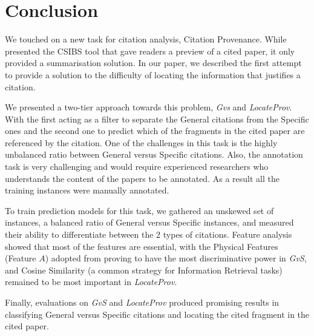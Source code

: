 \chapter{Conclusion}
\label{conclusion}
We touched on a new task for citation analysis, Citation Provenance. While  presented the CSIBS tool that gave readers a preview of a cited paper, it only provided a summarisation solution. In our paper, we described the first attempt to provide a solution to the difficulty of locating the information that justifies a citation.

We presented a two-tier approach towards this problem, {\it Gvs} and {\it LocateProv}. With the first acting as a filter to separate the General citations from the Specific ones and the second one to predict which of the fragments in the cited paper are referenced by the citation. One of the challenges in this task is the highly unbalanced ratio between General versus Specific citations. Also, the annotation task is very challenging and would require experienced researchers who understands the content of the papers to be annotated. As a result all the training instances were manually annotated.

To train prediction models for this task, we gathered an unskewed set of instances, a balanced ratio of General versus Specific instances, and measured their ability to differentiate between the 2 types of citations. Feature analysis showed that most of the features are essential, with the Physical Features (Feature $A$) adopted from  proving to have the most discriminative power in {\it GvS}, and Cosine Similarity (a common strategy for Information Retrieval tasks) remained to be most important in {\it LocateProv}.

Finally, evaluations on {\it GvS} and {\it LocateProv} produced promising results in classifying General versus Specific citations and locating the cited fragment in the cited paper.
